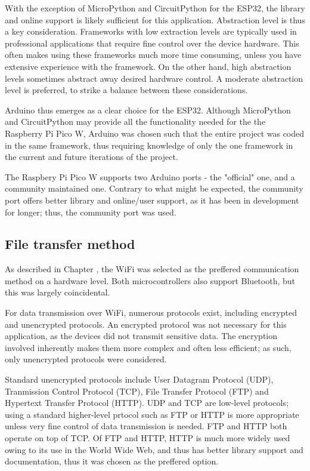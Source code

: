 \documentclass[class=report,11pt,crop=false]{standalone}
\begin{document}
With the exception of MicroPython and CircuitPython for the ESP32, the library and online support is likely sufficient for this application. Abstraction level is thus a key consideration. Frameworks with low extraction levels are typically used in professional applications that require fine control over the device hardware. This often makes using these frameworks much more time consuming, unless you have extensive experience with the framework. On the other hand, high abstraction levels sometimes abstract away desired hardware control. A moderate abstraction level is preferred, to strike a balance between these considerations.

Arduino thus emerges as a clear choice for the ESP32. Although MicroPython and CircuitPython may provide all the functionality needed for the the Raspberry Pi Pico W, Arduino was chosen such that the entire project was coded in the same framework, thus requiring knowledge of only the one framework in the current and future iterations of the project.

The Raspbery Pi Pico W supports two Arduino ports - the "official" one, and a community maintained one. Contrary to what might be expected, the community port offers better library and online/user support, as it has been in development for longer; thus, the community port was used.

\subsection{File transfer method}

As described in Chapter , the WiFi was selected as the preffered communication method on a hardware level. Both microcontrollers also support Bluetooth, but this was largely coincidental.

For data transmission over WiFi, numerous protocols exist, including encrypted and unencrypted protocols. An encrypted protocol was not necessary for this application, as the devices did not transmit sensitive data. The encryption involved inherently makes them more complex and often less efficient; as such, only unencrypted protocols were considered.

Standard unencrypted protocols include User Datagram Protocol (UDP), Tranmission Control Protocol (TCP), File Transfer Protocol (FTP) and Hypertext Transfer Protocol (HTTP). UDP and TCP are low-level protocols; using a standard higher-level prtocol such as FTP or HTTP is more appropriate unless very fine control of data transmission is needed. FTP and HTTP both operate on top of TCP. Of FTP and HTTP, HTTP is much more widely used owing to its use in the World Wide Web, and thus has better library support and documentation, thus it was chosen as the preffered option.
\end{document}
